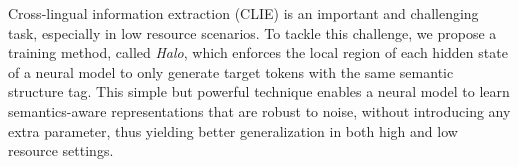 Cross-lingual information extraction (CLIE) is an important and challenging task, especially in low resource scenarios. To tackle this challenge, we propose a training method, called {\em Halo}, which enforces the local region of each hidden state of a neural model to only generate target tokens with the same semantic structure tag. This simple but powerful technique enables a neural model to learn semantics-aware representations that are robust to noise, without introducing any extra parameter, thus yielding better generalization in both high and low resource settings.
